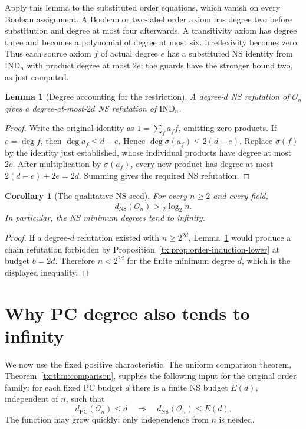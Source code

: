 \documentclass[11pt,a4paper,oneside,openany]{book}
\newtheorem{lemma}[theorem]{Lemma}
\newtheorem{corollary}[theorem]{Corollary}
\theoremstyle{definition}\newtheorem{definition}[theorem]{Definition}
\theoremstyle{remark}\newtheorem{remark}[theorem]{Remark}
\newcommand{\NS}{\mathrm{NS}}\newcommand{\PC}{\mathrm{PC}}
\numberwithin{equation}{chapter}
\begin{document}
Apply this lemma to the substituted order equations, which vanish on
every Boolean assignment. A Boolean or two-label order axiom has
degree two before substitution and degree at most four afterwards.
A transitivity axiom has degree three and becomes a polynomial of
degree at most six. Irreflexivity becomes zero. Thus each source
axiom $f$ of actual degree $e$ has a substituted NS identity from
$\mathrm{IND}_n$ with product degree at most $2e$; the guards have
the stronger bound two, as just computed.

\begin{lemma}[Degree accounting for the restriction]
\label{tx:lem:order-NS-restriction}
A degree-$d$ NS refutation of $\mathcal O_n$ gives a degree-at-most-$2d$
NS refutation of $\mathrm{IND}_n$.
\end{lemma}
\begin{proof}
Write the original identity as $1=\sum_f a_ff$, omitting zero
products. If $e=\deg f$, then $\deg a_f\le d-e$. Hence
$\deg\sigma(a_f)\le2(d-e)$. Replace $\sigma(f)$ by the identity
just established, whose individual products have degree at most $2e$.
After multiplication by $\sigma(a_f)$, every new product has degree
at most $2(d-e)+2e=2d$. Summing gives the required NS refutation.
\end{proof}

\begin{corollary}[The qualitative NS seed]
\label{tx:cor:order-NS-seed}
For every $n\ge2$ and every field,
\begin{equation}\label{tx:eq:order-log-seed}
                        d_{\NS}(\mathcal O_n)>
                                      \tfrac12\log_2 n.
\end{equation}
In particular, the NS minimum degrees tend to infinity.
\end{corollary}
\begin{proof}
If a degree-$d$ refutation existed with $n\ge2^{2d}$,
Lemma~\ref{tx:lem:order-NS-restriction} would produce a chain refutation
forbidden by Proposition~\ref{tx:prop:order-induction-lower} at budget
$b=2d$. Therefore $n<2^{2d}$ for the finite minimum degree $d$,
which is the displayed inequality.
\end{proof}

\section{Why PC degree also tends to infinity}
We now use the fixed positive characteristic. The uniform comparison
theorem, Theorem~\ref{tx:thm:comparison}, supplies the
following input for the original order family: for each fixed PC
budget $d$ there is a finite NS budget $E(d)$, independent of $n$,
such that
\begin{equation}\label{tx:eq:order-comparison-input}
 d_{\PC}(\mathcal O_n)\le d
               \quad\Longrightarrow\quad
 d_{\NS}(\mathcal O_n)\le E(d).
\end{equation}
The function may grow quickly; only independence from $n$ is needed.
\end{document}
